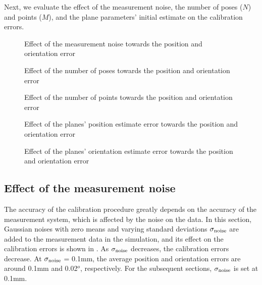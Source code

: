 Next, we evaluate the effect of the measurement noise, the number of poses ($N$) and points ($M$), and the plane parameters' initial estimate on the calibration errors. 


\begin{figure}[t]
  \centering
  \caption{Effect of the measurement noise towards the position and orientation error} 
  \label{fig:laser_noise}
\end{figure}


\begin{figure}[t]
  \centering
  \caption{Effect of the number of poses towards the position and orientation error} 
  \label{fig:num_of_poses}
\end{figure}


\begin{figure}[t]
  \centering
  \caption{Effect of the number of points towards the position and orientation error} 
  \label{fig:num_of_points}
\end{figure}

\begin{figure}[t]
  \centering
  \caption{Effect of the planes' position estimate error towards the position and orientation error} 
  \label{fig:plane_params_linear}
\end{figure}

\begin{figure}[t]
  \centering
  \caption{Effect of the planes' orientation estimate error towards the position and orientation error} 
  \label{fig:plane_params_angular}
\end{figure}




\subsection{Effect of the measurement noise}
\label{sec:meas_accuracy}
The accuracy of the calibration procedure greatly depends on the accuracy of the measurement system, which is affected by the noise on the data. In this section, Gaussian noises with zero means and varying standard deviations $\sigma_{\rm{noise}}$ are added to the measurement data in the simulation, and its effect on the calibration errors is shown in . As $\sigma_{\rm{noise}}$ decreases, the calibration errors decrease. At $\sigma_{\rm{noise}}$ = 0.1mm, the average position and orientation errors are around 0.1mm and 0.02$^o$, respectively. For the subsequent sections, $\sigma_{\rm{noise}}$ is set at 0.1mm. 

